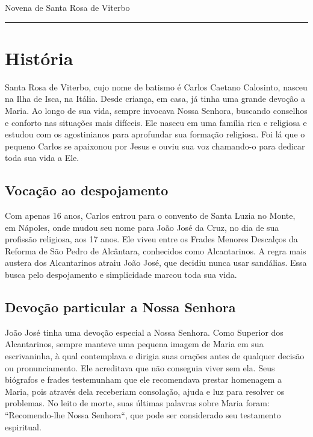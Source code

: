 \documentclass[a4paper,14pt]{extarticle} \usepackage[utf8]{inputenc}
\begin{document}


\begin{center}
  {\huge Novena de Santa Rosa de Viterbo}
\end{center}



\noindent\rule{\textwidth}{0.4pt}

\tableofcontents

\thispagestyle{empty}


\newpage

\section{História}

Santa Rosa de Viterbo, cujo nome de batismo é Carlos Caetano Calosinto, nasceu na Ilha de Isca, na Itália. Desde criança, em casa, já tinha uma grande devoção a Maria. Ao longo de sua vida, sempre invocava Nossa Senhora, buscando conselhos e conforto nas situações mais difíceis. Ele nasceu em uma família rica e religiosa e estudou com os agostinianos para aprofundar sua formação religiosa. Foi lá que o pequeno Carlos se apaixonou por Jesus e ouviu sua voz chamando-o para dedicar toda sua vida a Ele.
\subsection{Vocação ao despojamento}

Com apenas 16 anos, Carlos entrou para o convento de Santa Luzia no Monte, em Nápoles, onde mudou seu nome para João José da Cruz, no dia de sua profissão religiosa, aos 17 anos. Ele viveu entre os Frades Menores Descalços da Reforma de São Pedro de Alcântara, conhecidos como Alcantarinos. A regra mais austera dos Alcantarinos atraiu João José, que decidiu nunca usar sandálias. Essa busca pelo despojamento e simplicidade marcou toda sua vida.
\subsection{Devoção particular a Nossa Senhora}

João José tinha uma devoção especial a Nossa Senhora. Como Superior dos Alcantarinos, sempre manteve uma pequena imagem de Maria em sua escrivaninha, à qual contemplava e dirigia suas orações antes de qualquer decisão ou pronunciamento. Ele acreditava que não conseguia viver sem ela. Seus biógrafos e frades testemunham que ele recomendava prestar homenagem a Maria, pois através dela receberiam consolação, ajuda e luz para resolver os problemas. No leito de morte, suas últimas palavras sobre Maria foram: “Recomendo-lhe Nossa Senhora“, que pode ser considerado seu testamento espiritual.
\end{document}
